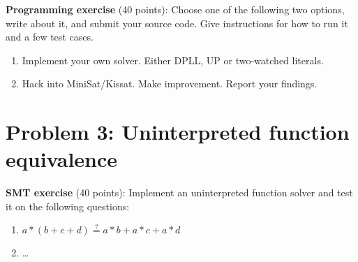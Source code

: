 \documentclass[11pt]{article}
\begin{document}
    \noindent \textbf{Programming exercise} (40 points): Choose one of the following two options, write about it, and submit your source code. Give instructions for how to run it and a few test cases.

    \begin{enumerate}
    \item Implement your own solver. Either DPLL, UP or two-watched literals.
    \item Hack into MiniSat/Kissat. Make improvement. Report your findings.
    \end{enumerate}

    \section {Problem 3: Uninterpreted function equivalence}


    \noindent \textbf{SMT exercise} (40 points): Implement an uninterpreted function solver and test it on the following questions:\\

    \begin{enumerate}
    \item $a * (b + c + d) \overset{?}{=} a * b + a * c + a * d$
    \item \ldots
    \end{enumerate}
\end{document}
